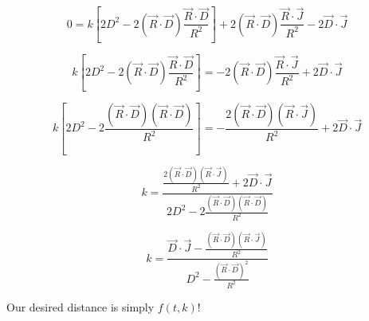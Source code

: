 \documentclass[12pt]{article}
\begin{document}
\[ 0 = k \left[ 2D^2 -2 (\vec{R} \cdot \vec{D}) \frac{\vec{R}\cdot\vec{D}}{R^2} \right] + 2(\vec{R} \cdot \vec{D})\frac{\vec{R}\cdot\vec{J}}{R^2} - 2\vec{D} \cdot \vec{J} \]

\[ k \left[ 2D^2 -2 (\vec{R} \cdot \vec{D}) \frac{\vec{R}\cdot\vec{D}}{R^2} \right] = -2(\vec{R} \cdot \vec{D})\frac{\vec{R}\cdot\vec{J}}{R^2} + 2\vec{D} \cdot \vec{J} \]

\[ k \left[ 2D^2 -2\frac{(\vec{R} \cdot \vec{D})(\vec{R}\cdot\vec{D})}{R^2} \right] = -\frac{2(\vec{R} \cdot \vec{D})(\vec{R}\cdot\vec{J})}{R^2} + 2\vec{D} \cdot \vec{J} \]

\[ k = \frac{ \frac{2(\vec{R} \cdot \vec{D})(\vec{R}\cdot\vec{J})}{R^2} + 2\vec{D} \cdot \vec{J} } { 2D^2 -2\frac{(\vec{R} \cdot \vec{D})(\vec{R}\cdot\vec{D})}{R^2} } \]

\[ k = \frac{ \vec{D} \cdot \vec{J} - \frac{(\vec{R} \cdot \vec{D})(\vec{R}\cdot\vec{J})}{R^2} } { D^2 -\frac{(\vec{R} \cdot \vec{D})^2}{R^2} } \]

Our desired distance is simply $f(t, k)$!
\end{document}
